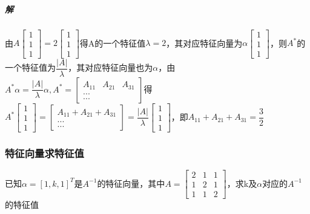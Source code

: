 \subparagraph{解}
由\(A\begin{bmatrix}
    1 \\ 
    1 \\ 
    1
\end{bmatrix} = 2\begin{bmatrix}
    1 \\ 
    1 \\ 
    1
\end{bmatrix}\)得A的一个特征值\(\lambda = 2\)，其对应特征向量为\(\alpha\begin{bmatrix}
    1 \\ 
    1 \\ 
    1
\end{bmatrix}\)，则\(A^*\)的一个特征值为\(\dfrac{|A|}{\lambda}\)，其对应特征向量也为\(\alpha\)，由\(A^*\alpha = \dfrac{|A|}{\lambda}\alpha, A^* = \begin{bmatrix}
    A_{11} & A_{21} & A_{31} \\
    ... \\
    ...
\end{bmatrix}\)得\(A^*\begin{bmatrix}
    1 \\ 
    1 \\ 
    1
\end{bmatrix} = \begin{bmatrix}
    A_{11} + A_{21} + A_{31} \\ 
    ... \\ 
    ...
\end{bmatrix} = \dfrac{|A|}{\lambda}\begin{bmatrix}
    1 \\ 
    1 \\ 
    1
\end{bmatrix}\)，即\(A_{11} + A_{21} + A_{31} = \dfrac{3}{2}\)

\subsubsection{特征向量求特征值}
已知\(\alpha = [1, k, 1]^T\)是\(A^{-1}\)的特征向量，其中\(A = \begin{bmatrix}
    2 & 1 & 1 \\ 
    1 & 2 & 1 \\ 
    1 & 1 & 2
\end{bmatrix}\)，求k及\(\alpha\)对应的\(A^{-1}\)的特征值

